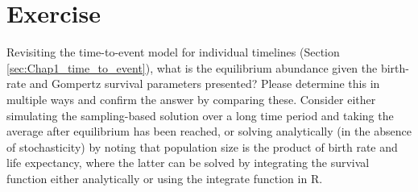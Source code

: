 \section{Exercise}

Revisiting the time-to-event model for individual timelines (Section \ref{sec:Chap1_time_to_event}), what is the equilibrium abundance given the birth-rate and Gompertz survival parameters presented?  Please determine this in multiple ways and confirm the answer by comparing these.  Consider either simulating the sampling-based solution over a long time period and taking the average after equilibrium has been reached, or solving analytically (in the absence of stochasticity) by noting that population size is the product of birth rate and life expectancy, where the latter can be solved by integrating the survival function either analytically or using the \colorbox{backcolour}{integrate} function in R.  

